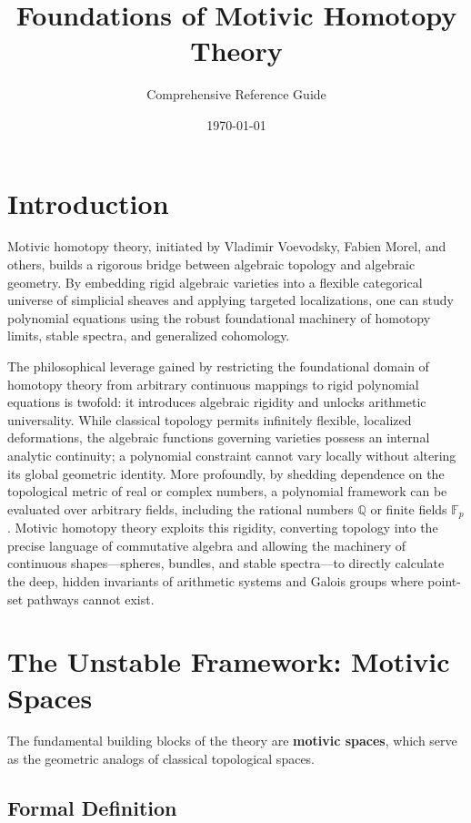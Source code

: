 \documentclass[11pt,oneside]{article}
\title{\textbf{Foundations of Motivic Homotopy Theory}}
\author{Comprehensive Reference Guide}
\date{\today}
\begin{document}
\maketitle

\section{Introduction}
Motivic homotopy theory, initiated by Vladimir Voevodsky, Fabien Morel, and others, builds a rigorous bridge between algebraic topology and algebraic geometry. By embedding rigid algebraic varieties into a flexible categorical universe of simplicial sheaves and applying targeted localizations, one can study polynomial equations using the robust foundational machinery of homotopy limits, stable spectra, and generalized cohomology.

The philosophical leverage gained by restricting the foundational domain of homotopy
theory from arbitrary continuous mappings to rigid polynomial equations is twofold: it
introduces algebraic rigidity and unlocks arithmetic universality. While classical topology
permits infinitely flexible, localized deformations, the algebraic functions governing
varieties possess an internal analytic continuity; a polynomial constraint cannot vary locally
without altering its global geometric identity. More profoundly, by shedding dependence on the
topological metric of real or complex numbers, a polynomial framework can be evaluated over
arbitrary fields, including the rational numbers $\mathbb{Q}$ or finite fields $\mathbb{F}_p$.
Motivic homotopy theory exploits this rigidity, converting topology into the precise language
of commutative algebra and allowing the machinery of continuous shapes—spheres, bundles, and
stable spectra—to directly calculate the deep, hidden invariants of arithmetic systems and
Galois groups where point-set pathways cannot exist.

\section{The Unstable Framework: Motivic Spaces}
The fundamental building blocks of the theory are \textbf{motivic spaces}, which serve as the geometric analogs of classical topological spaces. 

\subsection{Formal Definition}
\end{document}
